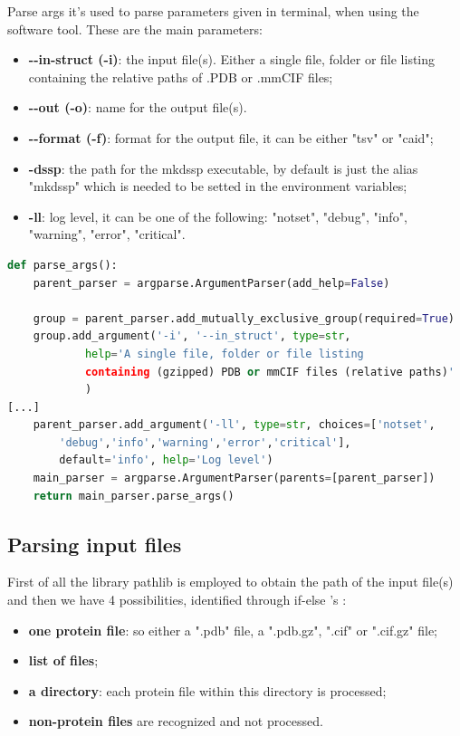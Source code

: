 Parse args it's used to parse parameters given in terminal, when using the software tool. These are the main parameters:
\begin{itemize}
    \item \textbf{-\vspace{0.1cm}-in-struct (-i)}: the input file(s). Either a single file, folder or file listing containing the relative paths of .PDB or .mmCIF files;
    \item \textbf{-\vspace{0.1cm}-out (-o)}: name for the output file(s).
    \item \textbf{-\vspace{0.1cm}-format (-f)}: format for the output file, it can be either "tsv" or "caid";
    \item \textbf{-dssp}: the path for the mkdssp executable, by default is just the alias "mkdssp" which is needed to be setted in the environment variables;
    \item \textbf{-ll}: log level, it can be one of the following: "notset", "debug", "info", "warning", "error", "critical".
\end{itemize}

\begin{lstlisting}[language=Python, caption=Command-line\ arguments\ parsing.]
def parse_args():
    parent_parser = argparse.ArgumentParser(add_help=False)

    group = parent_parser.add_mutually_exclusive_group(required=True)
    group.add_argument('-i', '--in_struct', type=str,
            help='A single file, folder or file listing 
            containing (gzipped) PDB or mmCIF files (relative paths)'
            )   
[...]
    parent_parser.add_argument('-ll', type=str, choices=['notset',
        'debug','info','warning','error','critical'], 
        default='info', help='Log level')
    main_parser = argparse.ArgumentParser(parents=[parent_parser])
    return main_parser.parse_args()
\end{lstlisting}

\subsection{Parsing input files}
First of all the library pathlib is employed to obtain the path of the input file(s) and then we have 4 possibilities, identified through if-else 's :
\begin{itemize}
    \item \textbf{one protein file}: so either a ".pdb" file, a ".pdb.gz", ".cif" or ".cif.gz" file;
    \item \textbf{list of files};
    \item \textbf{a directory}: each protein file within this directory is processed;
    \item \textbf{non-protein files} are recognized and not processed.
\end{itemize}

